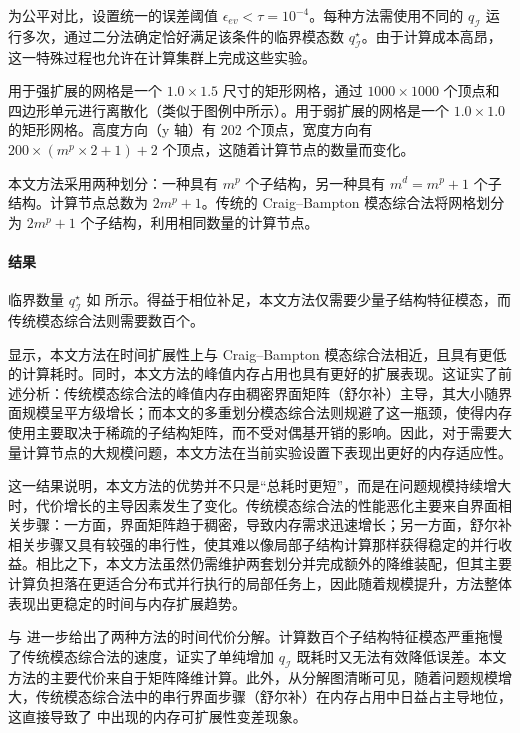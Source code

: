 为公平对比，设置统一的误差阈值 $\epsilon_{ev} < \tau=10^{-4}$。每种方法需使用不同的 $q_{\mathcal{I}}$ 运行多次，通过二分法确定恰好满足该条件的临界模态数 $q_\mathcal{I}^\star$。由于计算成本高昂，这一特殊过程也允许在计算集群上完成这些实验。

用于强扩展的网格是一个 $1.0 \times 1.5$ 尺寸的矩形网格，通过 $1000 \times 1000$ 个顶点和四边形单元进行离散化（类似于图例中所示）。用于弱扩展的网格是一个 $1.0 \times 1.0$ 的矩形网格。高度方向（y 轴）有 $202$ 个顶点，宽度方向有 $200 \times (m^p \times 2 + 1) + 2$ 个顶点，这随着计算节点的数量而变化。

本文方法采用两种划分：一种具有 $m^p$ 个子结构，另一种具有 $m^d = m^p + 1$ 个子结构。计算节点总数为 $2m^p + 1$。传统的 Craig--Bampton 模态综合法将网格划分为 $2m^p + 1$ 个子结构，利用相同数量的计算节点。

\paragraph{结果}
临界数量 $q_{\mathcal{I}}^\star$ 如  所示。\textcolor{ConclusionEvidence}{得益于相位补足，本文方法仅需要少量子结构特征模态，而传统模态综合法则需要数百个。}

 显示，本文方法在时间扩展性上与 Craig--Bampton 模态综合法相近，且具有更低的计算耗时。同时，本文方法的峰值内存占用也具有更好的扩展表现。这证实了前述分析：传统模态综合法的峰值内存由稠密界面矩阵（舒尔补）主导，其大小随界面规模呈平方级增长；而本文的多重划分模态综合法则规避了这一瓶颈，使得内存使用主要取决于稀疏的子结构矩阵，而不受对偶基开销的影响。因此，对于需要大量计算节点的大规模问题，本文方法在当前实验设置下表现出更好的内存适应性。

这一结果说明，本文方法的优势并不只是“总耗时更短”，而是在问题规模持续增大时，代价增长的主导因素发生了变化。传统模态综合法的性能恶化主要来自界面相关步骤：一方面，界面矩阵趋于稠密，导致内存需求迅速增长；另一方面，舒尔补相关步骤又具有较强的串行性，使其难以像局部子结构计算那样获得稳定的并行收益。相比之下，本文方法虽然仍需维护两套划分并完成额外的降维装配，但其主要计算负担落在更适合分布式并行执行的局部任务上，因此随着规模提升，方法整体表现出更稳定的时间与内存扩展趋势。

 与  进一步给出了两种方法的时间代价分解。计算数百个子结构特征模态严重拖慢了传统模态综合法的速度，证实了单纯增加 $q_{\mathcal{I}}$ 既耗时又无法有效降低误差。本文方法的主要代价来自于矩阵降维计算。\textcolor{IsConclusion}{此外，从分解图清晰可见，随着问题规模增大，传统模态综合法中的串行界面步骤（舒尔补）在内存占用中日益占主导地位，这直接导致了  中出现的内存可扩展性变差现象。}

